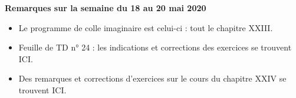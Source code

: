 \documentclass[12pt,a4paper]{article}
\begin{document}
% 
% 
% 
% 



\noindent\textbf{\bf Remarques sur la semaine du 18 au 20 mai 2020}
\begin{itemize}
\item Le programme de colle imaginaire est celui-ci : tout le chapitre XXIII.
\item Feuille de TD n° 24 : les indications et corrections des exercices se trouvent ICI.
\item Des remarques et corrections d'exercices sur le cours du chapitre XXIV se trouvent ICI.\vspace{.4cm}
\end{itemize}
 
\end{document}
